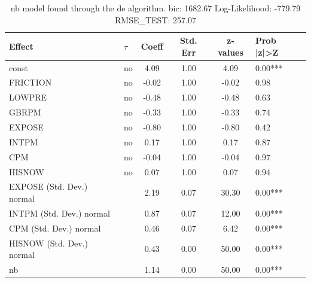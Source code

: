 \begin{table}
	\caption{nb model found through the de algorithm. bic: 1682.67 Log-Likelihood: -779.79 RMSE_TEST: 257.07}
	\begin{center}
		\begin{tabular}{|l|l|c|c|c|l|}
			\hline
			Effect & $\tau$ & Coeff & Std. Err & z-values & Prob |z|>Z \\
			\hline
			const & no & 4.09 & 1.00 & 4.09 & 0.00*** \\
			\hline
			FRICTION & no & -0.02 & 1.00 & -0.02 & 0.98 \\
			\hline
			LOWPRE & no & -0.48 & 1.00 & -0.48 & 0.63 \\
			\hline
			GBRPM & no & -0.33 & 1.00 & -0.33 & 0.74 \\
			\hline
			EXPOSE & no & -0.80 & 1.00 & -0.80 & 0.42 \\
			\hline
			INTPM & no & 0.17 & 1.00 & 0.17 & 0.87 \\
			\hline
			CPM & no & -0.04 & 1.00 & -0.04 & 0.97 \\
			\hline
			HISNOW & no & 0.07 & 1.00 & 0.07 & 0.94 \\
			\hline
			EXPOSE (Std. Dev.) normal &  & 2.19 & 0.07 & 30.30 & 0.00*** \\
			\hline
			INTPM (Std. Dev.) normal &  & 0.87 & 0.07 & 12.00 & 0.00*** \\
			\hline
			CPM (Std. Dev.) normal &  & 0.46 & 0.07 & 6.42 & 0.00*** \\
			\hline
			HISNOW (Std. Dev.) normal &  & 0.43 & 0.00 & 50.00 & 0.00*** \\
			\hline
			nb &  & 1.14 & 0.00 & 50.00 & 0.00*** \\
			\hline
		\end{tabular}
	\end{center}
\end{table}